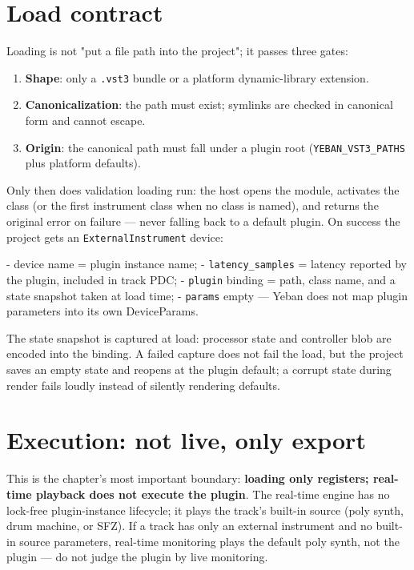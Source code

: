 \section{Load contract}

Loading is not "put a file path into the project"; it passes three gates:

\begin{enumerate}
  \item \textbf{Shape}: only a \texttt{.vst3} bundle or a platform dynamic-library extension.
  \item \textbf{Canonicalization}: the path must exist; symlinks are checked in canonical form and cannot escape.
  \item \textbf{Origin}: the canonical path must fall under a plugin root (\texttt{YEBAN\_VST3\_PATHS} plus platform defaults).
\end{enumerate}

Only then does validation loading run: the host opens the module, activates the class (or the first instrument class when no class is named), and returns the original error on failure — never falling back to a default plugin. On success the project gets an \texttt{ExternalInstrument} device:

- device name = plugin instance name;
- \texttt{latency\_samples} = latency reported by the plugin, included in track PDC;
- \texttt{plugin} binding = path, class name, and a state snapshot taken at load time;
- \texttt{params} empty — Yeban does not map plugin parameters into its own DeviceParams.

The state snapshot is captured at load: processor state and controller blob are encoded into the binding. A failed capture does not fail the load, but the project saves an empty state and reopens at the plugin default; a corrupt state during render fails loudly instead of silently rendering defaults.

\section{Execution: not live, only export}

This is the chapter's most important boundary: \textbf{loading only registers; real-time playback does not execute the plugin}. The real-time engine has no lock-free plugin-instance lifecycle; it plays the track's built-in source (poly synth, drum machine, or SFZ). If a track has only an external instrument and no built-in source parameters, real-time monitoring plays the default poly synth, not the plugin — do not judge the plugin by live monitoring.

